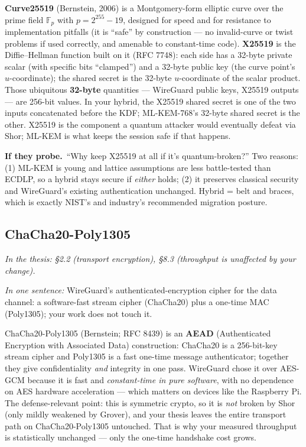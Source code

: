 \documentclass[11pt]{article}
\newcommand{\seethesis}[1]{%
  {\small\color{softgray}\textit{In the thesis: #1}}\par\vspace{3pt}}
\newcommand{\keyq}[1]{%
  \par\vspace{0.4em}%
  \noindent\colorbox{boxbg}{%
    \parbox{\dimexpr\textwidth-2\fboxsep}{%
      \small\textbf{\color{deepcyan}If they probe.}\ #1}}%
  \par\vspace{0.5em}}
\newcommand{\nutshell}[1]{\noindent\textit{In one sentence:} #1\par\vspace{4pt}}
\begin{document}
\textbf{Curve25519} (Bernstein, 2006) is a Montgomery-form elliptic curve over
the prime field $\mathbb{F}_p$ with $p = 2^{255}-19$, designed for speed and for
resistance to implementation pitfalls (it is ``safe'' by construction --- no
invalid-curve or twist problems if used correctly, and amenable to constant-time
code). \textbf{X25519} is the Diffie--Hellman function built on it (RFC 7748):
each side has a 32-byte private scalar (with specific bits ``clamped'') and a
32-byte public key (the curve point's $u$-coordinate); the shared secret is the
32-byte $u$-coordinate of the scalar product. Those ubiquitous \textbf{32-byte}
quantities --- WireGuard public keys, X25519 outputs --- are 256-bit values. In
your hybrid, the X25519 shared secret is one of the two inputs concatenated
before the KDF; ML-KEM-768's 32-byte shared secret is the other. X25519 is the
component a quantum attacker would eventually defeat via Shor; ML-KEM is what
keeps the session safe if that happens.

\keyq{``Why keep X25519 at all if it's quantum-broken?'' Two reasons: (1) ML-KEM
is young and lattice assumptions are less battle-tested than ECDLP, so a hybrid
stays secure if \emph{either} holds; (2) it preserves classical security and
WireGuard's existing authentication unchanged. Hybrid = belt and braces, which is
exactly NIST's and industry's recommended migration posture.}

\subsection{ChaCha20-Poly1305}
\seethesis{\S2.2 (transport encryption), \S8.3 (throughput is unaffected by your change).}
\nutshell{WireGuard's authenticated-encryption cipher for the data channel: a
software-fast stream cipher (ChaCha20) plus a one-time MAC (Poly1305); your work
does not touch it.}

ChaCha20-Poly1305 (Bernstein; RFC 8439) is an \textbf{AEAD} (Authenticated
Encryption with Associated Data) construction: ChaCha20 is a 256-bit-key stream
cipher and Poly1305 is a fast one-time message authenticator; together they give
confidentiality \emph{and} integrity in one pass. WireGuard chose it over
AES-GCM because it is fast and \emph{constant-time in pure software}, with no
dependence on AES hardware acceleration --- which matters on devices like the
Raspberry Pi. The defense-relevant point: this is symmetric crypto, so it is
\emph{not} broken by Shor (only mildly weakened by Grover), and your thesis
leaves the entire transport path on ChaCha20-Poly1305 untouched. That is why your
measured throughput is statistically unchanged --- only the one-time handshake
cost grows.
\end{document}
